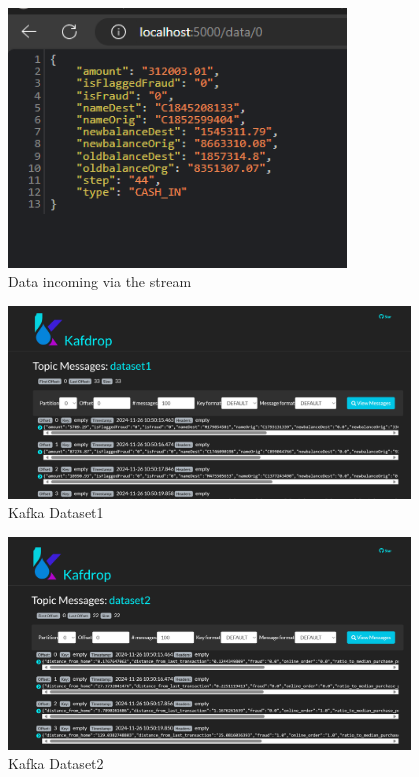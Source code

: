\documentclass[12pt,a4paper, hidelinks]{article}
\begin{document}
\begin{figure}[h!]
  \centering
  \includegraphics[width=0.8\textwidth]{images/test-stream-M2.png}
  \caption{Data incoming via the stream}
  \label{fig:streaming-api}
\end{figure}


\begin{figure}[h!]
  \centering
  \includegraphics[width=0.95\textwidth]{images/m2-kafka-1.png}
  \caption{Kafka Dataset1}
  \label{fig:kafka1}
\end{figure}

\begin{figure}[h!]
  \centering
  \includegraphics[width=0.95\textwidth]{images/m2-kafka-2.png}
  \caption{Kafka Dataset2}
  \label{fig:kafka2}
\end{figure}
\end{document}
